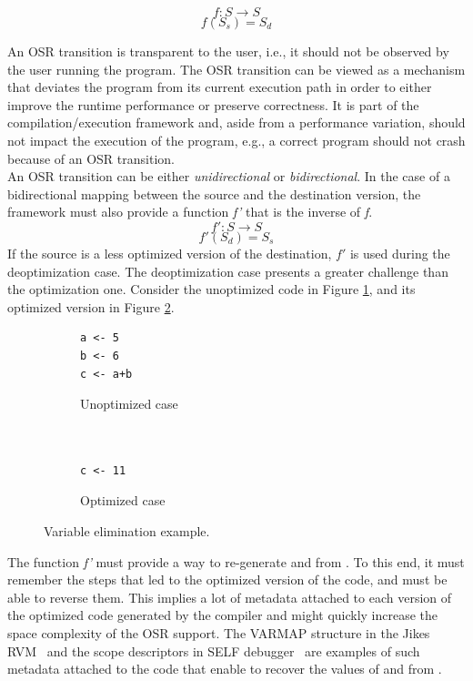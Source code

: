 \[f: S \rightarrow S\]
\[f(S_s) = S_d\]

An OSR transition is transparent to the user, i.e., it should not be observed by the user running the program.
The OSR transition can be viewed as a mechanism that deviates the program from its current execution path in order to either improve the runtime performance or preserve correctness.
It is part of the compilation/execution framework and, aside from a performance variation, should not impact the execution of the program, e.g., a correct program should not crash because of an OSR transition.\\

An OSR transition can be either \textit{unidirectional} or \textit{bidirectional}.
In the case of a bidirectional mapping between the source and the destination version, the framework must also provide a function \textit{f'} that is the inverse of \textit{f}.  
\[f': S \rightarrow S\]
\[f'(S_d) = S_s\]
If the source is a less optimized version of the destination, $f'$ is used during the deoptimization case.
The deoptimization case presents a greater challenge than the optimization one.
Consider the unoptimized code in Figure \ref{unoptimizedcase}, and its optimized version in Figure \ref{optimizedcase}.

\begin{figure}[h]
\centering
\begin{subfigure}{.49\textwidth}
  \centering
  \begin{lstlisting}
a <- 5
b <- 6
c <- a+b
    \end{lstlisting}
  \caption{Unoptimized case}
  \label{unoptimizedcase}
\end{subfigure}%
\begin{subfigure}{.49\textwidth}
  \centering
  \begin{lstlisting}
  
  
c <- 11
    \end{lstlisting}
  \caption{Optimized case}
  \label{optimizedcase}
\end{subfigure}
\caption{Variable elimination example.}
\label{variableEliminationExample}
\end{figure}


The function \textit{f'} must provide a way to re-generate  and  from . 
To this end, it must remember the steps that led to the optimized version of the code, and must be able to reverse them.
This implies a lot of metadata attached to each version of the optimized code generated by the compiler and might quickly increase the space complexity of the OSR support.
The VARMAP structure in the Jikes RVM~\cite{soman2006efficient} and the scope descriptors in SELF debugger~\cite{holzle1992debugging} are examples of such metadata attached to the code that enable to recover the values of  and  from .\\
 
